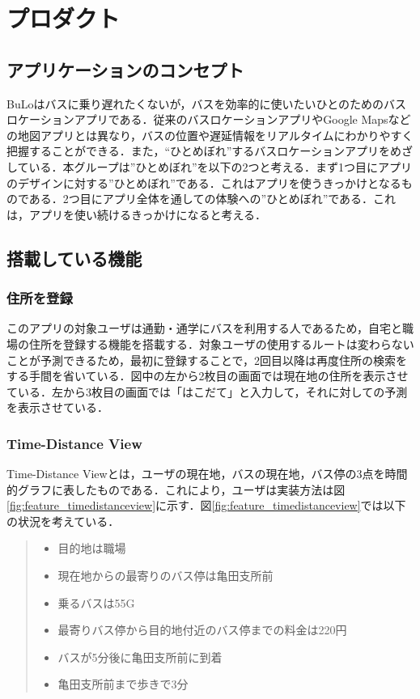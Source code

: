 \chapter{プロダクト}

\section{アプリケーションのコンセプト}
BuLoはバスに乗り遅れたくないが，バスを効率的に使いたいひとのためのバスロケーションアプリである．従来のバスロケーションアプリやGoogle Mapsなどの地図アプリとは異なり，バスの位置や遅延情報をリアルタイムにわかりやすく把握することができる．また，“ひとめぼれ”するバスロケーションアプリをめざしている．本グループは”ひとめぼれ”を以下の2つと考える．まず1つ目にアプリのデザインに対する”ひとめぼれ”である．これはアプリを使うきっかけとなるものである．2つ目にアプリ全体を通しての体験への”ひとめぼれ”である．これは，アプリを使い続けるきっかけになると考える．

\section{搭載している機能}
\subsection{住所を登録}
このアプリの対象ユーザは通勤・通学にバスを利用する人であるため，自宅と職場の住所を登録する機能を搭載する．対象ユーザの使用するルートは変わらないことが予測できるため，最初に登録することで，2回目以降は再度住所の検索をする手間を省いている．図中の左から2枚目の画面では現在地の住所を表示させている．左から3枚目の画面では「はこだて」と入力して，それに対しての予測を表示させている．
\subsection{Time-Distance View}
Time-Distance Viewとは，ユーザの現在地，バスの現在地，バス停の3点を時間的グラフに表したものである．これにより，ユーザは実装方法は図\ref{fig:feature_timedistanceview}に示す．図\ref{fig:feature_timedistanceview}では以下の状況を考えている．
\begin{quote}
    \begin{itemize}
        \item 目的地は職場
        \item 現在地からの最寄りのバス停は亀田支所前
        \item 乗るバスは55G
        \item 最寄りバス停から目的地付近のバス停までの料金は220円
        \item バスが5分後に亀田支所前に到着
        \item 亀田支所前まで歩きで3分
    \end{itemize}
\end{quote}

